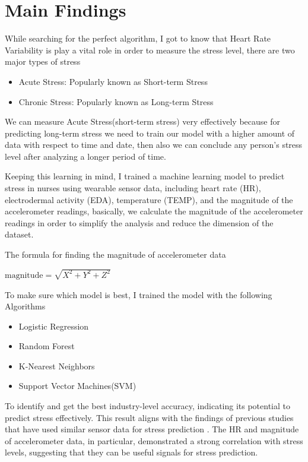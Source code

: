 \documentclass{article}
\begin{document}
\section{Main Findings}

\par While searching for the perfect algorithm, I got to know that Heart Rate Variability is play a vital role in order to measure the stress level\cite{7754331}, there are two major types of stress

\begin{itemize}
    \item Acute Stress: Popularly known as Short-term Stress
    \item Chronic Stress: Popularly known as Long-term Stress
\end{itemize}\cite{firbit5366}


We can measure Acute Stress(short-term stress) very effectively because for predicting long-term stress we need to train our model with a higher amount of data with respect to time and date, then also we can conclude any person's stress level after analyzing a longer period of time.

Keeping this learning in mind, I trained a machine learning model to predict stress in nurses using wearable sensor data, including heart rate (HR), electrodermal activity (EDA), temperature (TEMP), and the magnitude
of the accelerometer readings, basically, we calculate the magnitude of the accelerometer readings
in order to simplify the analysis and reduce the dimension of the dataset.

\noindent The formula for finding the magnitude of accelerometer data
\begin{center}
    $ 
    \text{magnitude} = \sqrt{X^2 + Y^2 + Z^2} \
    $
\end{center}

To make sure which model is best, I trained the model with the following Algorithms 

\begin{itemize}
    \item Logistic Regression
    \item Random Forest
    \item K-Nearest Neighbors
    \item Support Vector Machines(SVM)
\end{itemize}

To identify and get the best industry-level accuracy, indicating its potential to predict stress effectively. This result aligns with the findings of previous studies that have used similar sensor data for stress prediction\cite{stressmonitoring_iq3244} \cite{VOS2023105026} \cite{Modeling_the_Dynamics_of_Physiological}. The HR and magnitude of accelerometer data, in particular, demonstrated a strong correlation with stress levels, suggesting that they can be useful signals for stress prediction.
\end{document}
